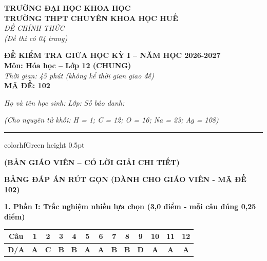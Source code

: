 \documentclass[11pt,a4paper]{article}
\begin{document}
\begin{minipage}[t]{0.48\textwidth}
\textbf{TRƯỜNG ĐẠI HỌC KHOA HỌC}\\
\textbf{TRƯỜNG THPT CHUYÊN KHOA HỌC HUẾ}\\
\textit{ĐỀ CHÍNH THỨC}\\
\textit{(Đề thi có 04 trang)}
\end{minipage}
\hfill
\begin{minipage}[t]{0.48\textwidth}
\raggedleft
\textbf{\color{hfRed}ĐỀ KIỂM TRA GIỮA HỌC KỲ I -- NĂM HỌC 2026-2027}\\
\textbf{Môn: Hóa học -- Lớp 12 (CHUNG)}\\
\textit{Thời gian: 45 phút (không kể thời gian giao đề)}\\
\textbf{MÃ ĐỀ: 102}
\end{minipage}

\vspace{4pt}
\noindent
\textit{Họ và tên học sinh:} \dotfill \textit{Lớp:} \dotfill \textit{Số báo danh:} \dotfill

\vspace{3pt}
\noindent
\textit{\footnotesize (Cho nguyên tử khối: H = 1; C = 12; O = 16; Na = 23; Ag = 108)}

\vspace{3pt}
\hrule color{hfGreen} height 0.5pt


\vspace{4pt}
\begin{center}
\textbf{\color{hfRed}\large (BẢN GIÁO VIÊN -- CÓ LỜI GIẢI CHI TIẾT)}
\end{center}

\vspace{2pt}
\begin{center}
{\color{hfRed}\textbf{\large BẢNG ĐÁP ÁN RÚT GỌN (DÀNH CHO GIÁO VIÊN - MÃ ĐỀ 102)}}
\end{center}

\vspace{2pt}
\noindent
\textbf{\color{mainGreen}1. Phần I: Trắc nghiệm nhiều lựa chọn (3,0 điểm - mỗi câu đúng 0,25 điểm)}
\begin{center}
\renewcommand{\arraystretch}{1.2}
\begin{tabular}{|c|c|c|c|c|c|c|c|c|c|c|c|c|}
\hline
\rowcolor{tableGreen}
\textbf{Câu} & \textbf{1} & \textbf{2} & \textbf{3} & \textbf{4} & \textbf{5} & \textbf{6} & \textbf{7} & \textbf{8} & \textbf{9} & \textbf{10} & \textbf{11} & \textbf{12} \\
\hline
\textbf{Đ/A} & \textbf{\color{hfRed}A} & \textbf{\color{hfRed}C} & \textbf{\color{hfRed}B} & \textbf{\color{hfRed}B} & \textbf{\color{hfRed}A} & \textbf{\color{hfRed}A} & \textbf{\color{hfRed}B} & \textbf{\color{hfRed}B} & \textbf{\color{hfRed}D} & \textbf{\color{hfRed}A} & \textbf{\color{hfRed}A} & \textbf{\color{hfRed}A} \\
\hline
\end{tabular}
\end{center}
\end{document}
